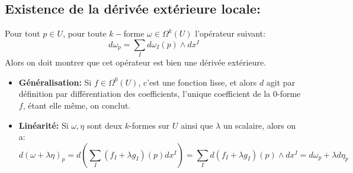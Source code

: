    \subsection*{Existence de la dérivée extérieure locale{:}}
      Pour tout \( p \in U \), pour toute \( k- \)forme \( \omega \in \Omega^k(U)\) l'opérateur suivant:
      \[ 
         d\omega_p = \sum_I d\omega_I(p) \wedge dx^I
      \]
      Alors on doit montrer que cet opérateur est bien une dérivée extérieure.
      \begin{itemize}
         \item \textbf{Généralisation:} Si \( f \in \Omega^0(U) \), c'est une fonction lisse, et alors \( d \) agit par définition par différentiation des coefficients, l'unique coefficient de la \( 0 \)-forme \( f \), étant elle même, on conclut.
         \item \textbf{Linéarité:} Si \( \omega, \eta \) sont deux \( k \)-formes sur \( U \) ainsi que \( \lambda \) un scalaire, alors on a:
         \[ 
            d( \omega + \lambda\eta)_p = d\left( \sum_I (f_I + \lambda g_I)(p) dx^I\right) = \sum_I d(f_I + \lambda g_I)(p) \wedge dx^I = d\omega_p + \lambda d\eta_p
         \]
         \pagebreak


\end{itemize}
